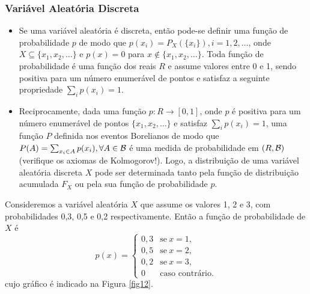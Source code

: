 \begin{frame}
\frametitle{\textbf{Variável Aleatória Discreta}}
\baselineskip=13pt
\begin{block}{}

\begin{itemize}
\item Se uma variável aleatória é
discreta, então pode-se definir uma função de probabilidade $p$
de modo que $p(x_i)=P_X(\{x_i\}), i=1,2,\ldots$, onde $X\subseteq
\{x_1,x_2,\ldots\}$ e $p(x)=0$ para $x\notin \{x_1,x_2,\ldots\}$.
Toda função de probabilidade é uma função dos reais $R$ e
assume valores entre 0 e 1, sendo positiva para um número enumerável
de pontos e satisfaz a seguinte propriedade $\sum_i p(x_i)=1$.


\item Reciprocamente, dada uma função $p:R\rightarrow [0,1]$, onde $p$ é
positiva para um número enumerável de pontos $\{x_1,x_2,\ldots\}$ e
satisfaz $\sum_i p(x_i)=1$, uma função $P$ definida nos eventos
Borelianos de modo que $P(A)=\sum_{x_i\in A}p(x_i), \forall A\in {\cal B}$
é uma medida de probabilidade em $(R,{\cal B})$ (verifique os axiomas de Kolmogorov!). Logo, a distribuição de uma variável aleatória
discreta $X$ pode ser determinada tanto pela função de distribuição
acumulada $F_X$ ou pela sua função de probabilidade $p$.
\end{itemize}

\end{block}

\begin{exem}
	Consideremos a variável aleatória $X$ que assume os valores 1,  2 e 3, com probabilidades 0,3, 0,5 e 0,2 respectivamente. Então a função de
	probabilidade de $X$ é 
	$$
	p(x) =
	\begin{cases}
	0,3 & \text{se} \ x = 1, \\
	0,5 & \text{se} \ x = 2, \\
	0,2 & \text{se} \ x = 3, \\
	0 & \text{caso contrário}.
	\end{cases}
	$$
	cujo gráfico é indicado na Figura \ref{fig12}.
\end{exem}
\end{frame}


